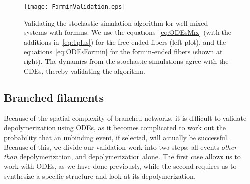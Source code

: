 \documentclass[11pt]{article}
\begin{document}
\begin{appendices}
\begin{figure}
\centering
\texttt{[image: ForminValidation.eps]}
\caption{\label{fig:ForminValid}Validating the stochastic simulation algorithm for well-mixed systems with formins. We use the equations\ \eqref{eq:ODEsMix} (with the additions in\ \eqref{eq:1plus}) for the free-ended fibers (left plot), and the equations\ \eqref{eq:ODEsFormin} for the formin-ended fibers (shown at right). The dynamics from the stochastic simulations agree with the ODEs, thereby validating the algorithm. }
\end{figure}

\subsection{Branched filaments}
Because of the spatial complexity of branched networks, it is difficult to validate depolymerization using ODEs, as it becomes complicated to work out the probability that an unbinding event, if selected, will actually be successful. Because of this, we divide our validation work into two steps: all events \emph{other than} depolymerization, and depolymerization alone. The first case allows us to work with ODEs, as we have done previously, while the second requires us to synthesize a specific structure and look at its depolymerization. 


\end{appendices}
\end{document}
